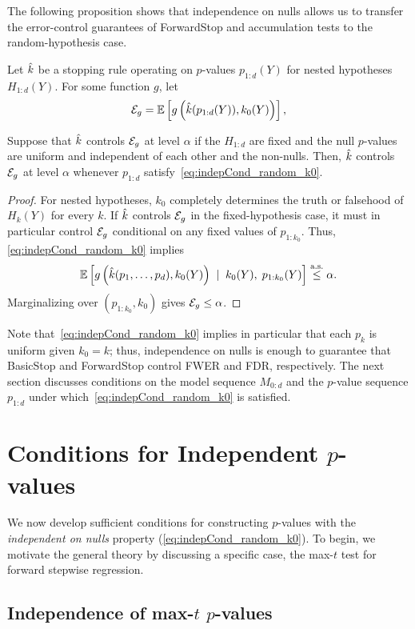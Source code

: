 \documentclass{article}
\begin{document}
The following proposition shows that independence on nulls allows us to transfer the error-control guarantees of ForwardStop and accumulation tests to the random-hypothesis case.
\begin{proposition}
  Let $\hat{k}$ be a stopping rule operating on $p$-values $p_{1:d}(Y)$ for nested hypotheses $H_{1:d}(Y)$. For some function $g$, let
  \[
  \mathcal{E}_g = \mathbb{E}\left[ g\left(\hat{k}(p_{1:d}(Y)), k_0(Y)\right)\right],
  \]
  
  Suppose that $\hat{k}$ controls $\mathcal{E}_g$ at level $\alpha$ if the $H_{1:d}$ are fixed and the null $p$-values are uniform and independent of each other and the non-nulls. Then, $\hat{k}$ controls $\mathcal{E}_g$ at level $\alpha$ whenever $p_{1:d}$ satisfy~\eqref{eq:indepCond_random_k0}.
\end{proposition}
\begin{proof}
    For nested hypotheses, $k_0$ completely determines the truth or falsehood of $H_k(Y)$ for every $k$. If $\hat{k}$ controls $\mathcal{E}_g$ in the 
fixed-hypothesis case, it must in particular control $\mathcal{E}_g$ conditional on any fixed values of $p_{1:k_0}$. Thus, \eqref{eq:indepCond_random_k0} implies
  \[
  \mathbb{E}\left[ g\left(\hat{k}(p_1,\ldots,p_d), k_0(Y)\right) \;\mid\;
      k_0(Y), \; p_{1:k_0}(Y)\right] \overset{\textrm{a.s.}}{\leq} \alpha.
  \]
  Marginalizing over $(p_{1:k_0},k_0)$ gives $\mathcal{E}_g\leq \alpha$.
\end{proof}

Note that~\eqref{eq:indepCond_random_k0} implies in particular that each $p_k$ is uniform given $k_0=k$; thus, independence on nulls is enough to guarantee that BasicStop and ForwardStop control FWER and FDR, respectively. The next section discusses conditions on the model sequence $M_{0:d}$ and the $p$-value sequence $p_{1:d}$ under which~\eqref{eq:indepCond_random_k0} is satisfied.

\section{Conditions for Independent $p$-values}\label{sec:pValsIndep}

We now develop sufficient conditions for constructing $p$-values with the {\it independent on nulls} property (\ref{eq:indepCond_random_k0}). To begin, we motivate the general theory by discussing a specific case, the max-$t$ test for forward stepwise regression.

\subsection{Independence of max-$t$ $p$-values}
\end{document}
